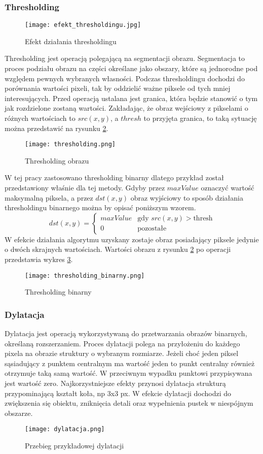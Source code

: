 \subsubsection{Thresholding}
\begin{figure}[H]
	\centering
	\texttt{[image: efekt\_thresholdingu.jpg]}
	\caption{Efekt działania thresholdingu}
	\label{fig:efekt_thresholdingu}
\end{figure}
Thresholding jest operacją polegającą na segmentacji obrazu. Segmentacja to proces podziału obrazu na części określane jako obszary, które są jednorodne pod względem pewnych wybranych własności. Podczas thresholdingu dochodzi do porównania wartości pixeli, tak by oddzielić ważne piksele od tych mniej interesujących. Przed operacją ustalana jest granica, która będzie stanowić o tym jak rozdzielone zostaną wartości.
Zakładając, że obraz wejściowy z pikselami o różnych wartościach to $ src(x,y) $, a $thresh$ to przyjęta granica, to taką sytuację można przedstawić na rysunku \ref{fig:thresholding}.
\begin{figure}[H]
	\centering
	\texttt{[image: thresholding.png]}
	\caption{Thresholding obrazu}
	\label{fig:thresholding}
\end{figure}
W tej pracy zastosowano thresholding binarny dlatego przykład został przedstawiony właśnie dla tej metody. Gdyby przez $maxValue$ oznaczyć wartość maksymalną piksela, a przez $dst(x,y)$ obraz wyjściowy to sposób działania thresholdingu binarnego można by opisać poniższym wzorem.
$$
dst(x,y) = \left\{ \begin{array}{ll}
maxValue & \textrm{gdy $src(x,y)>$thresh}\\
0 & \textrm{pozostałe}
\end{array} \right.
$$
W efekcie działania algorytmu uzyskany zostaje obraz posiadający piksele jedynie o dwóch skrajnych wartościach. Wartości obrazu z rysunku \ref{fig:thresholding} po operacji przedstawia wykres \ref{fig:thresholding_binarny}.
\begin{figure}[H]
	\centering
	\texttt{[image: thresholding\_binarny.png]}
	\caption{Thresholding binarny}
	\label{fig:thresholding_binarny}
\end{figure}

\subsubsection{Dylatacja}
Dylatacja jest operacją wykorzystywaną do przetwarzania obrazów binarnych, określaną rozszerzaniem. Proces dylatacji polega na przyłożeniu do każdego pixela na obrazie struktury o wybranym rozmiarze. Jeżeli choć jeden piksel sąsiadujący z punktem centralnym ma wartość jeden to punkt centralny również otrzymuje taką samą wartość. W przeciwnym wypadku punktowi przypisywana jest wartość zero. Najkorzystniejsze efekty przynosi dylatacja strukturą przypominającą kształt koła, np 3x3 px. W efekcie dylatacji dochodzi do zwiększenia się obiektu, zniknięcia detali oraz wypełnienia pustek w niespójnym obszarze.
\begin{figure}[H]
	\centering
	\texttt{[image: dylatacja.png]}
	\caption{Przebieg przykładowej dylatacji}
	\label{fig:dylatacja}
\end{figure}

